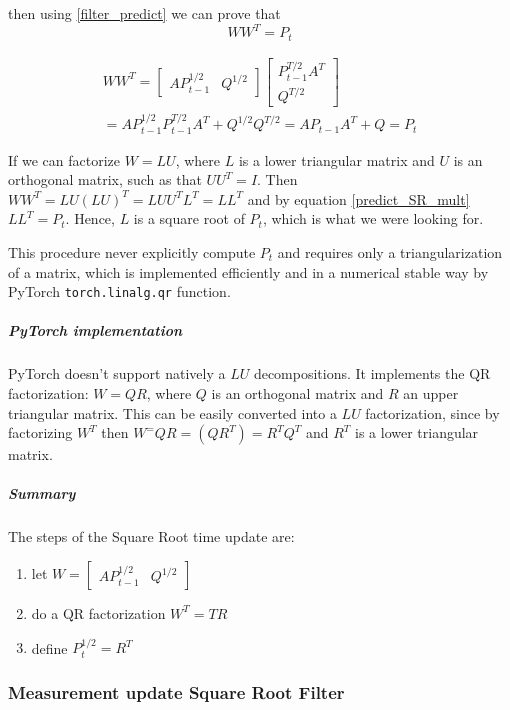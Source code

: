 \documentclass{article}
\let\Oldsubsubsection\subsubsection
\renewcommand{\subsubsection}{\FloatBarrier\Oldsubsubsection}
\begin{document}
then using \ref{filter_predict} we can prove that
\begin{equation}\label{predict_SR_mult}
WW^T = P_t 
\end{equation}

\begin{multline}
  WW^T =  \begin{bmatrix}AP_{t-1}^{1/2} & Q^{1/2}\end{bmatrix}\begin{bmatrix}P_{t-1}^{T/2}A^T \\ Q^{T/2}\end{bmatrix}\\
  = AP_{t-1}^{1/2}P_{t-1}^{T/2}A^T + Q^{1/2}Q^{T/2} = AP_{t-1}A^T + Q = P_t
\end{multline}

If we  can factorize $W=LU$, where $L$ is a lower triangular matrix and $U$ is an orthogonal matrix, such as that $UU^T = I$. Then $WW^T = LU(LU)^T = LUU^TL^T = LL^T$ and by equation \ref{predict_SR_mult} $LL^T=P_t$. Hence, $L$ is a square root of $P_t$, which is what we were looking for.

This procedure never explicitly compute $P_t$ and requires only a triangularization of a matrix, which is implemented efficiently and in a numerical stable way by PyTorch \verb|torch.linalg.qr| function. 

\subparagraph{PyTorch implementation} PyTorch doesn't support natively a $LU$ decompositions. It implements the QR factorization: $W=QR$, where $Q$ is an orthogonal matrix and $R$ an upper triangular matrix. This can be easily converted into a $LU$ factorization, since by factorizing $W^T$ then $W^=QR=(QR^T)=R^TQ^T$ and $R^T$ is a lower triangular matrix.

\subparagraph{Summary} The steps of the Square Root time update are:

\begin{enumerate}
    \item let  $W = \begin{bmatrix}AP_{t-1}^{1/2} & Q^{1/2}\end{bmatrix}$
    \item do a QR factorization $W^T=TR$
    \item define $P_t^{1/2} = R^T$
\end{enumerate}

\subsubsection{Measurement update Square Root Filter}
\end{document}
